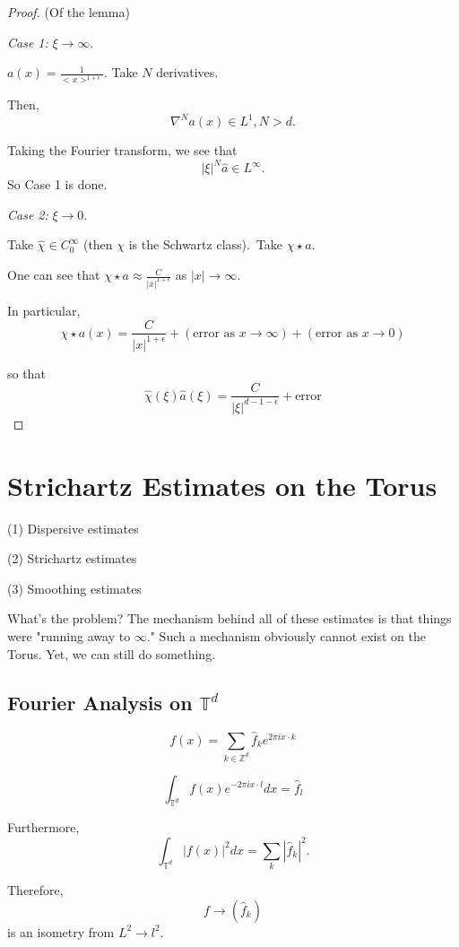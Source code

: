 \documentclass[11pt]{amsart}
\theoremstyle{plain}
\numberwithin{equation}{section}
\theoremstyle{remark}
\begin{document}
\begin{proof} (Of the lemma)

\emph{Case 1:} $\xi\rightarrow\infty.$

$a(x)=\frac{1}{<x>^{1+\epsilon}}.$ Take $N$ derivatives.

Then, $$\nabla^N a(x) \in L^1, N>d.$$

Taking the Fourier transform, we see that $$|\xi|^N \hat{a} \in L^\infty.$$  So Case 1 is done. 

\emph{Case 2:} $\xi\rightarrow 0.$

Take $\hat{\chi} \in C^{\infty}_0$ (then $\chi$ is the Schwartz class).\
Take $\chi \star a.$

One can see that $\chi\star a \approx \frac{C}{|x|^{1+\epsilon}}$ as $|x|\rightarrow \infty.$

In particular, $$\chi\star a (x) = \frac{C}{|x|^{1+\epsilon}} + (\text{error as} \, \, x\rightarrow\infty) + (\text{error as} \,\, x\rightarrow 0) $$

so that $$\hat{\chi}(\xi)\hat{a}(\xi)= \frac{C}{|\xi|^{d-1-\epsilon}}+ \text{error}$$
\end{proof}


\section{Strichartz Estimates on the Torus}

(1) Dispersive estimates

(2) Strichartz estimates

(3) Smoothing estimates

What's the problem? The mechanism behind all of these estimates is that things were "running away to $\infty.$" Such a mechanism obviously cannot exist on the Torus. Yet, we can still do something. 

\subsection{Fourier Analysis on $\mathbb{T}^d$}

$$f(x)= \sum_{k\in \mathbb{Z}^d} \hat{f}_k e^{2\pi i x\cdot k}$$

$$\int_{\mathbb{T}^d}f(x)e^{-2\pi i x\cdot l}dx= \hat{f}_l$$

Furthermore, $$\int_{\mathbb{T}^d} |f(x)|^2 dx= \sum_{k} |\hat{f}_k|^2.$$

Therefore, $$f\rightarrow (\hat{f}_k)$$ is an isometry from $L^2 \rightarrow l^2.$
\end{document}
